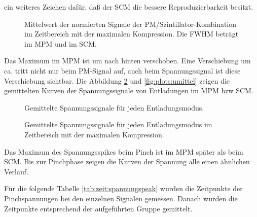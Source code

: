 ein weiteres Zeichen dafür, daß der SCM die bessere Reproduzierbarkeit
besitzt.
%
\par
\begin{figure}[H]
  \center
  \caption{Mittelwert der normierten Signale der PM/Szintillator-Kombination
     im Zeitbereich mit der maximalen Kompression. Die FWHM beträgt im MPM
      und  im SCM.}
  \label{fig:plots:pmmittel}
\end{figure}
%
\par
Das Maximum im MPM ist um  nach hinten verschoben. Eine
Verschiebung um ca.  tritt nicht nur beim PM-Signal auf,
auch beim Spannungssignal ist diese Verschiebung sichtbar.
%
%
Die Abbildung \ref{fig:plots:ualle} und \vref{fig:plots:umittel} zeigen
die gemittelten Kurven der Spannungssignale von Entladungen im MPM bzw
SCM.
%
\par
\begin{figure}[H]
  \center
  \caption{Gemittelte Spannungssignale für jeden Entladungsmodus.}
  \label{fig:plots:ualle}
\end{figure}
%
\par
\begin{figure}[H]
  \center
  \caption{Gemittelte Spannungssignale für jeden Entladungsmodus im
     Zeitbereich mit der maximalen Kompression.}
  \label{fig:plots:umittel}
\end{figure}
%
\par
Das Maximum des Spannungsspikes beim Pinch ist im MPM
 später als beim SCM. Bis zur Pinchphase zeigen die
Kurven der Spannung alle einen ähnlichen Verlauf.
\par
Für die folgende Tabelle \vref{tab:zeit:spannungspeak} wurden die
Zeitpunkte der Pinchspannungen bei den einzelnen Signalen gemessen.
Danach wurden die Zeitpunkte entsprechend der aufgeführten Gruppe
gemittelt.
%
\par
